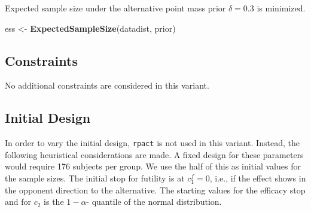 \documentclass[]{book}
\newenvironment{Shaded}{\begin{snugshade}}{\end{snugshade}}
\newcommand{\KeywordTok}[1]{\textcolor[rgb]{0.13,0.29,0.53}{\textbf{#1}}}
\newcommand{\NormalTok}[1]{#1}
\newcommand{\StringTok}[1]{\textcolor[rgb]{0.31,0.60,0.02}{#1}}
\begin{document}
Expected sample size under the alternative point mass prior \(\delta = 0.3\)
is minimized.

\begin{Shaded}
\begin{Highlighting}[]
\NormalTok{ess <-}\StringTok{ }\KeywordTok{ExpectedSampleSize}\NormalTok{(datadist, prior)}
\end{Highlighting}
\end{Shaded}

\hypertarget{constraints-10}{%
\subsection{Constraints}\label{constraints-10}}

No additional constraints are considered in this variant.

\hypertarget{initial-design-8}{%
\subsection{Initial Design}\label{initial-design-8}}

In order to vary the initial design, \texttt{rpact} is not used in this variant.
Instead, the following heuristical considerations are made.
A fixed design for these parameters would require
176
subjects per group. We use the half of this as initial values for the
sample sizes.
The initial stop for futility is at \(c_1^f=0\), i.e., if the effect shows
in the opponent direction to the alternative.
The starting values for the efficacy stop and for \(c_2\) is the \(1-\alpha\)-
quantile of the normal distribution.
\end{document}
